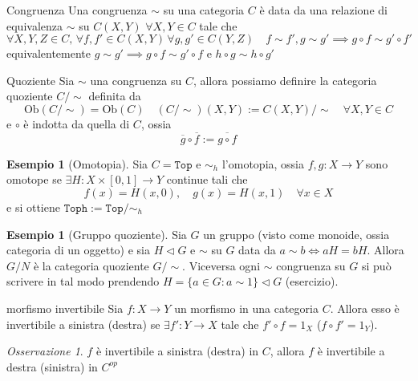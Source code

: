 \documentclass[notitlepage]{report}
\newcounter{theo}[section]\setcounter{theo}{0}
\newcounter{excounter}[section]\setcounter{excounter}{0}
\numberwithin{equation}{section}
\theoremstyle{plain}
\theoremstyle{definition}
\newtheorem{example}[excounter]{Esempio}
\theoremstyle{remark}
\newtheorem*{remark}{Osservazione}
\begin{document}
\begin{definition}{Congruenza}
    Una congruenza \(\sim \) su una categoria \(C\) è data da una relazione di
    equivalenza \(\sim \) su \(C{(X, Y)}\) \(\forall X, Y \in C\) tale che
    \[
      \forall X, Y, Z \in C, \, \forall f, f' \in C{(X, Y)} \, \forall g,
      g' \in C{(Y, Z)} \quad f \sim f', g \sim g' \implies g \circ f \sim g'
      \circ f'
    \]
    equivalentemente \(g \sim g' \implies g \circ f \sim g' \circ f\) e \(h \circ g \sim h \circ g'\) 
\end{definition}

\begin{definition}{Quoziente}
    Sia \(\sim \) una congruenza su \(C\), allora possiamo definire la categoria
    quoziente \(C / \sim \) definita da
    \[
      \mathrm{Ob}{(C / \sim )} = \mathrm{Ob}{(C)} \quad {(C / \sim )}{(X, Y)} :=
      C{(X, Y)} / \sim \quad \forall X, Y \in C
    \]
    e \(\circ\) è indotta da quella di \(C\), ossia
    \[
      \overline{g} \circ \overline{f} := \overline{g \circ f}
    \]
\end{definition}

\begin{example}[Omotopia]
    Sia \(C = \mathtt{Top}\) e \(\sim_h \) l'omotopia, ossia \(f, g : X \to Y\)
    sono omotope se \(\exists  H : X \times [0, 1] \to Y\) continue tali che 
    \[
      f{(x)} = H{(x, 0)}, \quad g{(x)} = H{(x, 1)} \quad \forall x \in X
    \]
    e si ottiene \(\mathtt{Toph} := \mathtt{Top} / \sim_h \) 
\end{example}

\begin{example}[Gruppo quoziente]
    Sia \(G\) un gruppo (visto come monoide, ossia categoria di un oggetto) e
    sia \(H \vartriangleleft G\) e \(\sim \) su \(G\) data da \(a \sim b \iff aH
    = bH\). Allora \(G/N\) è la categoria quoziente \(G / \sim \).
    Viceversa ogni \(\sim \) congruenza su \(G\) si può scrivere in tal
    modo prendendo \(H = \{a \in G : a \sim 1\} \vartriangleleft G \) (esercizio).
\end{example}

\begin{definition}{morfismo invertibile}
    Sia \(f : X\to Y\) un morfismo in una categoria \(C\). Allora esso è
    invertibile a sinistra (destra) se \(\exists  f' : Y \to X\) tale che
    \(f' \circ f = 1_X\) (\(f \circ f' = 1_Y\)).
\end{definition}
\begin{remark}{}
    \(f\) è invertibile a sinistra (destra) in \(C\), allora \(f\) è invertibile
    a destra (sinistra) in \(C^{op}\) 
\end{remark}
\end{document}
